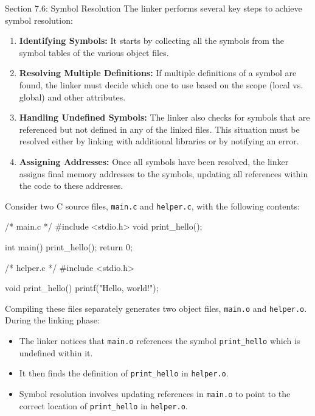 \begin{notes}{Section 7.6: Symbol Resolution}
    The linker performs several key steps to achieve symbol resolution:
    \begin{enumerate}
        \item \textbf{Identifying Symbols:} It starts by collecting all the symbols from the symbol tables of the various object files.
        \item \textbf{Resolving Multiple Definitions:} If multiple definitions of a symbol are found, the linker must decide which one to use based on the scope (local vs. global) and other attributes.
        \item \textbf{Handling Undefined Symbols:} The linker also checks for symbols that are referenced but not defined in any of the linked files. This situation must be resolved either by linking 
        with additional libraries or by notifying an error.
        \item \textbf{Assigning Addresses:} Once all symbols have been resolved, the linker assigns final memory addresses to the symbols, updating all references within the code to these addresses.
    \end{enumerate}
    
    \begin{highlight}
        Consider two C source files, \texttt{main.c} and \texttt{helper.c}, with the following contents:
    
    \begin{code}[C]
    /* main.c */
    #include <stdio.h>
    void print_hello();
    
    int main() {
        print_hello();
        return 0;
    }
    \end{code}

    \begin{code}[C]
    /* helper.c */
    #include <stdio.h>
    
    void print_hello() {
        printf("Hello, world!\n");
    }
    \end{code}
        
        Compiling these files separately generates two object files, \texttt{main.o} and \texttt{helper.o}. During the linking phase:
        \begin{itemize}
            \item The linker notices that \texttt{main.o} references the symbol \texttt{print\_hello} which is undefined within it.
            \item It then finds the definition of \texttt{print\_hello} in \texttt{helper.o}.
            \item Symbol resolution involves updating references in \texttt{main.o} to point to the correct location of \texttt{print\_hello} in \texttt{helper.o}.
        \end{itemize}
    \end{highlight}
    

\end{notes}
